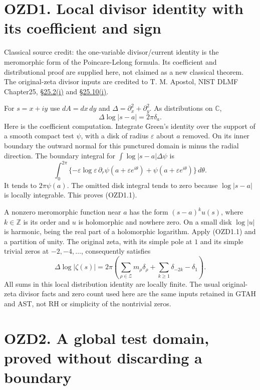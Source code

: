 \section{OZD1. Local divisor identity with its coefficient and
sign}\label{ozd1.-local-divisor-identity-with-its-coefficient-and-sign}

Classical source credit: the one-variable divisor/current identity is
the meromorphic form of the Poincare-Lelong formula. Its coefficient and
distributional proof are supplied here, not claimed as a new classical
theorem. The original-zeta divisor inputs are credited to T. M. Apostol,
NIST DLMF Chapter25, \href{https://dlmf.nist.gov/25.2\#i}{§25.2(i)} and
\href{https://dlmf.nist.gov/25.10\#i}{§25.10(i)}.

For \(s=x+iy\) use \(dA=dx\,dy\) and
\(\Delta=\partial_x^2+\partial_y^2\). As distributions on \(\mathbb C\),
\[
\Delta\log|s-a|=2\pi\delta_a.
\tag{OZD1.1}
\] Here is the coefficient computation. Integrate Green's identity over
the support of a smooth compact test \(\psi\), with a disk of radius
\(\varepsilon\) about \(a\) removed. On its inner boundary the outward
normal for this punctured domain is minus the radial direction. The
boundary integral for \(\int\log|s-a|\Delta\psi\) is \[
\int_0^{2\pi}\{-\varepsilon\log\varepsilon\,\partial_r\psi(a+\varepsilon e^{i\theta})
+\psi(a+\varepsilon e^{i\theta})\}\,d\theta.
\] It tends to \(2\pi\psi(a)\). The omitted disk integral tends to zero
because \(\log|s-a|\) is locally integrable. This proves (OZD1.1).

A nonzero meromorphic function near \(a\) has the form \((s-a)^k u(s)\),
where \(k\in\mathbb Z\) is its order and \(u\) is holomorphic and
nowhere zero. On a small disk \(\log|u|\) is harmonic, being the real
part of a holomorphic logarithm. Apply (OZD1.1) and a partition of
unity. The original zeta, with its simple pole at \(1\) and its simple
trivial zeros at \(-2,-4,\ldots\), consequently satisfies \[
\boxed{\Delta\log|\zeta(s)|
=2\pi\left(\sum_{\rho\in\mathscr Z}m_\rho\delta_\rho
+\sum_{k\ge1}\delta_{-2k}-\delta_1\right).}
\tag{OZD1.2}
\] All sums in this local distribution identity are locally finite. The
usual original-zeta divisor facts and zero count used here are the same
inputs retained in GTAH and AST, not RH or simplicity of the nontrivial
zeros.

\section{OZD2. A global test domain, proved without discarding a
boundary}\label{ozd2.-a-global-test-domain-proved-without-discarding-a-boundary}

